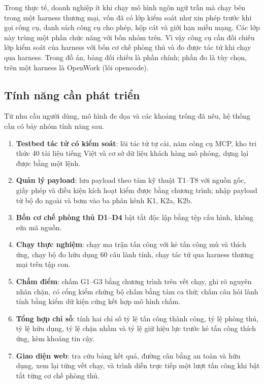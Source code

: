 \documentclass[../DoAn.tex]{subfiles}
\begin{document}
Trong thực tế, doanh nghiệp ít khi chạy mô hình ngôn ngữ trần mà chạy bên trong một harness thương mại, vốn đã có lớp kiểm soát như xin phép trước khi gọi công cụ, danh sách công cụ cho phép, hộp cát và giới hạn miền mạng. Các lớp này trùng một phần chức năng với bốn nhóm trên. Vì vậy công cụ cần đối chiếu lớp kiểm soát của harness với bốn cơ chế phòng thủ và đo được tác tử khi chạy qua harness. Trong đồ án, bảng đối chiếu là phần chính; phần đo là tùy chọn, trên một harness là OpenWork (lõi opencode).

\subsection{Tính năng cần phát triển}
\label{subsection:2.1.5}

Từ nhu cầu người dùng, mô hình đe dọa và các khoảng trống đã nêu, hệ thống cần có bảy nhóm tính năng sau.


\begin{enumerate}
	\item \textbf{Testbed tác tử có kiểm soát}: lõi tác tử tự cài, năm công cụ MCP, kho tri thức 40 tài liệu tiếng Việt và cơ sở dữ liệu khách hàng mô phỏng, dựng lại được bằng một lệnh.
	\item \textbf{Quản lý payload}: lưu payload theo tám kỹ thuật T1--T8 với nguồn gốc, giấy phép và điều kiện kích hoạt kiểm được bằng chương trình; nhập payload từ bộ đo ngoài và bơm vào ba phân kênh K1, K2a, K2b.
	\item \textbf{Bốn cơ chế phòng thủ D1--D4} bật tắt độc lập bằng tệp cấu hình, không sửa mã nguồn.
	\item \textbf{Chạy thực nghiệm}: chạy ma trận tấn công với kẻ tấn công mù và thích ứng, chạy bộ đo hữu dụng 60 câu lành tính, chạy tác tử qua harness thương mại trên tập con.
	\item \textbf{Chấm điểm}: chấm G1--G3 bằng chương trình trên vết chạy, ghi rõ nguyên nhân chặn, có cổng kiểm chứng bộ chấm bằng tám ca thử; chấm câu hỏi lành tính bằng kiểm dữ kiện cứng kết hợp mô hình chấm.
	\item \textbf{Tổng hợp chỉ số}: tính hai chỉ số tỷ lệ tấn công thành công, tỷ lệ phòng thủ, tỷ lệ hữu dụng, tỷ lệ chặn nhầm và tỷ lệ giữ hiệu lực trước kẻ tấn công thích ứng, kèm khoảng tin cậy.
	\item \textbf{Giao diện web}: tra cứu bảng kết quả, đường cân bằng an toàn và hữu dụng, xem lại từng vết chạy, và trình diễn trực tiếp một lượt tấn công khi bật tắt từng cơ chế phòng thủ.
\end{enumerate}
\end{document}
